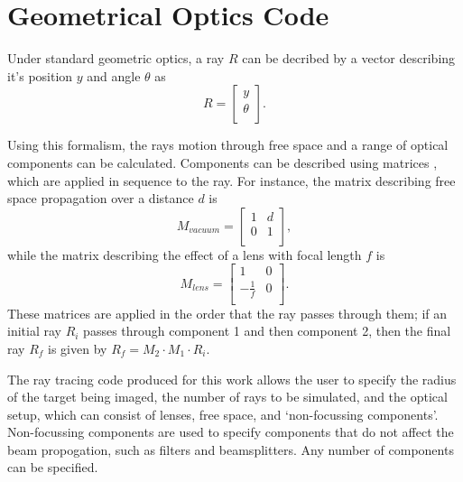


\section{Geometrical Optics Code} \label{appdx: Ray Tracing}

Under standard geometric optics, a ray $R$ can be decribed by a vector describing it's position $y$ and angle $\theta$ as 
\[R = 
\begin{bmatrix}
           y \\
           \theta \\
         \end{bmatrix}.
         \]
         
Using this formalism, the rays motion through free space and a range of optical components can be calculated. Components can be described using matrices \cite{Gerrard1975}, which are applied in sequence to the ray. For instance, the matrix describing free space propagation over a distance $d$ is
\[M_{vacuum} = 
\begin{bmatrix}
           1 & d \\
           0 & 1 \\
         \end{bmatrix},
         \]
while the matrix describing the effect of a lens with focal length $f$ is 
\[M_{lens} = 
\begin{bmatrix}
           1 & 0 \\
           -\frac{1}{f} & 0 \\
         \end{bmatrix}.
         \]
These matrices are applied in the order that the ray passes through them; if an initial ray $R_i$ passes through component 1 and then component 2, then the final ray $R_f$ is given by $R_f = M_2 \cdot M_{1} \cdot R_i$.

The ray tracing code produced for this work allows the user to specify the radius of the target being imaged, the number of rays to be simulated, and the optical setup, which can consist of lenses, free space, and `non-focussing components'. Non-focussing components are used to specify components that do not affect the beam propogation, such as filters and beamsplitters. Any number of components can be specified. 

